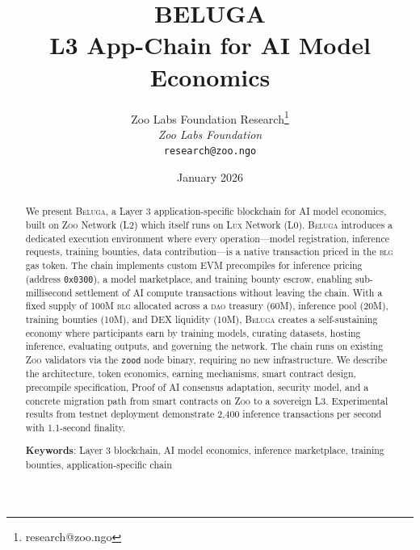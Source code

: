 \documentclass[11pt,letterpaper]{article}
\title{\textbf{BELUGA}\\
\large L3 App-Chain for AI Model Economics}
\author{
Zoo Labs Foundation Research\thanks{research@zoo.ngo}\\
\textit{Zoo Labs Foundation}\\
\texttt{research@zoo.ngo}
}
\date{January 2026}
\newcommand{\Zoo}{\textsc{Zoo}}
\newcommand{\Lux}{\textsc{Lux}}
\newcommand{\Beluga}{\textsc{Beluga}}
\newcommand{\BLG}{\textsc{blg}}
\newcommand{\DAO}{\textsc{dao}}
\begin{document}
\zoocoverpage

\begin{abstract}
We present \Beluga{}, a Layer 3 application-specific blockchain for AI model economics, built on \Zoo{} Network (L2) which itself runs on \Lux{} Network (L0). \Beluga{} introduces a dedicated execution environment where every operation---model registration, inference requests, training bounties, data contribution---is a native transaction priced in the \BLG{} gas token. The chain implements custom EVM precompiles for inference pricing (address \texttt{0x0300}), a model marketplace, and training bounty escrow, enabling sub-millisecond settlement of AI compute transactions without leaving the chain. With a fixed supply of 100M \BLG{} allocated across a \DAO{} treasury (60M), inference pool (20M), training bounties (10M), and DEX liquidity (10M), \Beluga{} creates a self-sustaining economy where participants earn by training models, curating datasets, hosting inference, evaluating outputs, and governing the network. The chain runs on existing \Zoo{} validators via the \texttt{zood} node binary, requiring no new infrastructure. We describe the architecture, token economics, earning mechanisms, smart contract design, precompile specification, Proof of AI consensus adaptation, security model, and a concrete migration path from smart contracts on \Zoo{} to a sovereign L3. Experimental results from testnet deployment demonstrate 2,400 inference transactions per second with 1.1-second finality.

\textbf{Keywords}: Layer 3 blockchain, AI model economics, inference marketplace, training bounties, application-specific chain
\end{abstract}

\tableofcontents
\newpage













\end{document}

